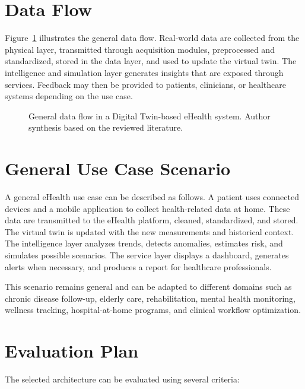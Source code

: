 \section{Data Flow}
Figure~\ref{fig:data_flow} illustrates the general data flow. Real-world data are collected from the physical layer, transmitted through acquisition modules, preprocessed and standardized, stored in the data layer, and used to update the virtual twin. The intelligence and simulation layer generates insights that are exposed through services. Feedback may then be provided to patients, clinicians, or healthcare systems depending on the use case.

\begin{figure}[H]
    \centering
    \resizebox{0.98\textwidth}{!}{}
    \caption{General data flow in a Digital Twin-based eHealth system. Author synthesis based on the reviewed literature.}
    \label{fig:data_flow}
\end{figure}

\section{General Use Case Scenario}
A general eHealth use case can be described as follows. A patient uses connected devices and a mobile application to collect health-related data at home. These data are transmitted to the eHealth platform, cleaned, standardized, and stored. The virtual twin is updated with the new measurements and historical context. The intelligence layer analyzes trends, detects anomalies, estimates risk, and simulates possible scenarios. The service layer displays a dashboard, generates alerts when necessary, and produces a report for healthcare professionals.

This scenario remains general and can be adapted to different domains such as chronic disease follow-up, elderly care, rehabilitation, mental health monitoring, wellness tracking, hospital-at-home programs, and clinical workflow optimization.

\section{Evaluation Plan}
The selected architecture can be evaluated using several criteria:

